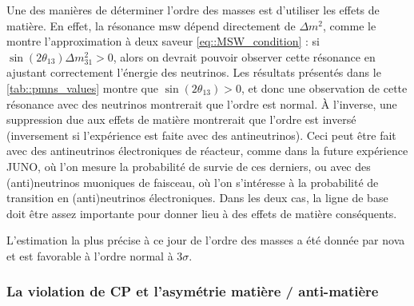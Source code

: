         Une des manières de déterminer l'ordre des masses est d'utiliser les effets de matière. En effet, la résonance \gls{msw} dépend directement de $\Delta m^2$, comme le montre l'approximation à deux saveur \eqref{eq::MSW_condition} : si $\sin(2\theta_{13})\Delta m^2_{31} > 0$, alors on devrait pouvoir observer cette résonance en ajustant correctement l'énergie des neutrinos. Les résultats présentés dans le \autoref{tab::pmns_values} montre que $\sin(2\theta_{13}) > 0$, et donc une observation de cette résonance avec des neutrinos montrerait que l'ordre est normal. À l'inverse, une suppression due aux effets de matière montrerait que l'ordre est inversé (inversement si l'expérience est faite avec des antineutrinos). Ceci peut être fait avec des antineutrinos électroniques de réacteur, comme dans la future expérience JUNO\cite{Yang2015}, où l'on mesure la probabilité de survie de ces derniers, ou avec des (anti)neutrinos muoniques de faisceau, où l'on s'intéresse à la probabilité de transition en (anti)neutrinos électroniques. Dans les deux cas, la ligne de base doit être assez importante pour donner lieu à des effets de matière conséquents.
        
        L'estimation la plus précise à ce jour de l'ordre des masses a été donnée par \gls{nova} et est favorable à l'ordre normal à 3$\sigma$\cite{Salas2018}.
        

      \subsubsection{La violation de CP et l'asymétrie matière / anti-matière}

